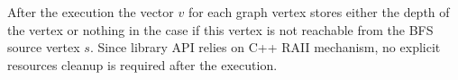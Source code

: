 After the execution the vector $v$ for each graph vertex stores either the depth of the vertex or nothing in the case if this vertex is not reachable from the BFS source vertex $s$. Since library API relies on C++ RAII mechanism, no explicit resources cleanup is required after the execution.







